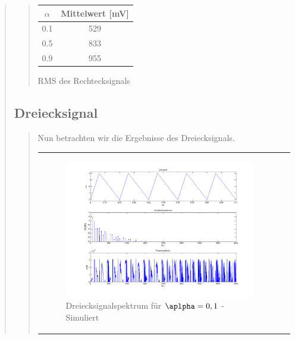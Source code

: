 \begin{quote}
\begin{quote}
            \begin{center}
                  \begin{tabular}{|c|c|}
                  \hline
                   $\alpha $ &  Mittelwert [mV] \\ \hline 
                   0.1 &  529 \\ \hline
                   0.5 &  833 \\ \hline
                   0.9 &  955 \\ \hline           
                 \end{tabular}
                       \caption{RMS des Rechtecksignals}
                        \label{tablelabel1}
            
            \end{center}
        
    \end{quote}
    
    \subsection{Dreiecksignal}
    \begin{quote}
    
    	Nun betrachten wir die Ergebnisse des Dreiecksignals.

            \begin{center}
            \begin{tabular}{ll}

            \hspace{-12em}
                \begin{minipage}{0.6\textwidth}

                    \begin{figure}[H]
                        \label{fig:}            
                        \includegraphics[scale=0.25]{./Bilder/drei_alpha1.png} %
                        \caption{Dreiecksignalspektrum für $\aplpha = 0,1$ - Simuliert}
                    \end{figure}


\end{minipage}
\end{tabular}
\end{center}
\end{quote}
\end{quote}
